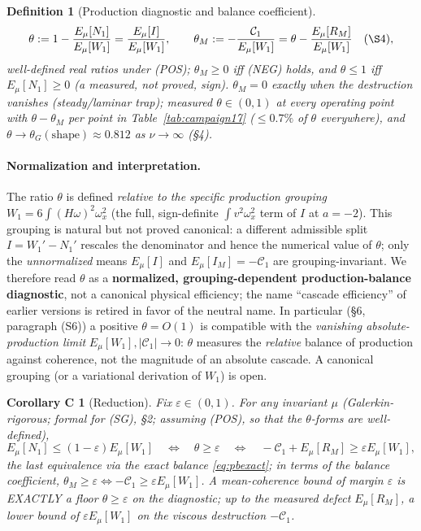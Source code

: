 \documentclass[11pt]{article}
\newtheorem{definition}[theorem]{Definition}
\theoremstyle{remark}
\theoremstyle{plain}
\newtheorem*{thmC}{Corollary C}
\newcommand{\eqdef}{:=}
\begin{document}
\begin{definition}[Production diagnostic and balance coefficient]
\begin{equation}
\theta \eqdef 1 - \frac{E_\mu[N_1]}{E_\mu[W_1]} = \frac{E_\mu[I]}{E_\mu[W_1]},
\qquad
\theta_M \eqdef -\frac{\mathcal{C}_1}{E_\mu[W_1]} = \theta - \frac{E_\mu[R_M]}{E_\mu[W_1]}
\quad(\S4),
\end{equation}
well-defined real ratios under (POS); $\theta_M \ge 0$ iff (NEG) holds, and $\theta \le 1$
iff $E_\mu[N_1] \ge 0$ (a measured, not proved, sign). $\theta_M = 0$ exactly when the
destruction vanishes (steady/laminar trap); measured $\theta \in (0,1)$ at every operating
point with $\theta - \theta_M$ per point in Table~\ref{tab:campaign17} ($\le 0.7\%$ of
$\theta$ everywhere), and $\theta \to \theta_G(\text{shape})
\approx 0.812$ as $\nu\to\infty$ (\S4).
\end{definition}

\paragraph{Normalization and interpretation.} The ratio $\theta$ is defined
\emph{relative to the specific production grouping} $W_1 = 6\int(H\omega)^2\omega_x^2$ (the full,
sign-definite $\int v^2\omega_x^2$ term of $I$ at $a=-2$). This grouping is natural but not proved
canonical: a different admissible split $I = W_1' - N_1'$ rescales the denominator and hence the
numerical value of $\theta$; only the \emph{unnormalized} means $E_\mu[I]$ and
$E_\mu[I_M] = -\mathcal{C}_1$ are grouping-invariant. We therefore read $\theta$ as a \textbf{normalized, grouping-dependent
production-balance diagnostic}, not a canonical physical efficiency; the name ``cascade
efficiency'' of earlier versions is retired in favor of the neutral name. In particular (\S6, paragraph (S6)) a positive $\theta = O(1)$ is
compatible with the \emph{vanishing absolute-production limit} $E_\mu[W_1], |\mathcal{C}_1| \to 0$: $\theta$
measures the \emph{relative} balance of production against coherence, not the magnitude of an
absolute cascade. A canonical grouping (or a variational derivation of $W_1$) is open.

\begin{thmC}[Reduction]
Fix $\varepsilon \in (0,1)$. For any invariant $\mu$ (Galerkin-rigorous; formal for (SG), \S2;
assuming (POS), so that the
$\theta$-forms are well-defined),
\begin{equation}
   E_\mu[N_1] \le (1-\varepsilon) E_\mu[W_1]
   \quad\iff\quad \theta \ge \varepsilon
   \quad\iff\quad -\mathcal{C}_1 + E_\mu[R_M] \ge \varepsilon E_\mu[W_1],
\end{equation}
the last equivalence via the exact balance \eqref{eq:pbexact}; in terms of the balance
coefficient, $\theta_M \ge \varepsilon \iff -\mathcal{C}_1 \ge \varepsilon E_\mu[W_1]$.
A mean-coherence bound of margin $\varepsilon$ is EXACTLY a floor $\theta \ge \varepsilon$
on the diagnostic; up to the measured defect $E_\mu[R_M]$, a lower bound of
$\varepsilon E_\mu[W_1]$ on the viscous destruction $-\mathcal{C}_1$.
\end{thmC}
\end{document}
